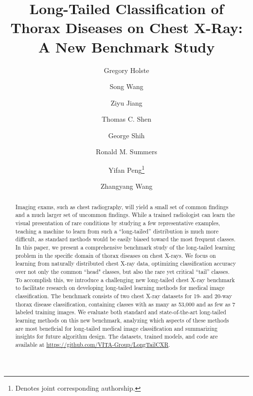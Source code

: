 \documentclass[runningheads]{llncs}
\begin{document}
\raggedbottom

\title{Long-Tailed Classification of Thorax Diseases on Chest X-Ray: A New Benchmark Study}
\author{Gregory Holste \and
Song Wang \and
Ziyu Jiang \and
Thomas C. Shen \and
George Shih \and
Ronald M. Summers \and
Yifan Peng\thanks{Denotes joint corresponding authorship.} \and
Zhangyang Wang \textsuperscript{}}

\maketitle              

\begin{abstract}
Imaging exams, such as chest radiography, will yield a small set of common findings and a much larger set of uncommon findings. While a trained radiologist can learn the visual presentation of rare conditions by studying a few representative examples, teaching a machine to learn from such a “long-tailed” distribution is much more difficult, as standard methods would be easily biased toward the most frequent classes. In this paper, we present a comprehensive benchmark study of the long-tailed learning problem in the specific domain of thorax diseases on chest X-rays. We focus on learning from naturally distributed chest X-ray data, optimizing classification accuracy over not only the common ``head" classes, but also the rare yet critical ``tail” classes. To accomplish this, we introduce a challenging new long-tailed chest X-ray benchmark to facilitate research on developing long-tailed learning methods for medical image classification. The benchmark consists of two chest X-ray datasets for 19- and 20-way thorax disease classification, containing classes with as many as 53,000 and as few as 7 labeled training images. We evaluate both standard and state-of-the-art long-tailed learning methods on this new benchmark, analyzing which aspects of these methods are most beneficial for long-tailed medical image classification and summarizing insights for future algorithm design. The datasets, trained models, and code are available at \url{https://github.com/VITA-Group/LongTailCXR}.



\end{abstract}
\end{document}
